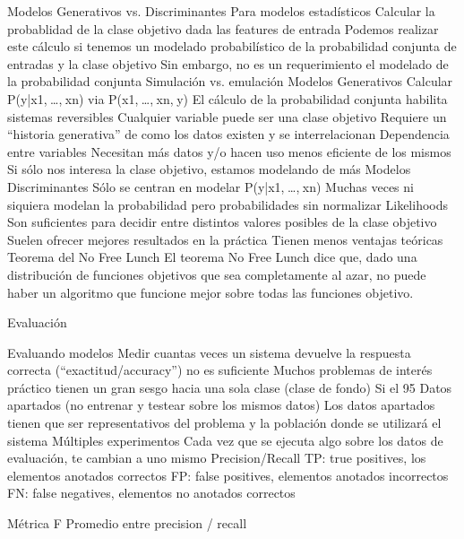 Modelos Generativos vs. Discriminantes
Para modelos estadísticos
Calcular la probablidad de la clase objetivo dada las features de entrada
Podemos realizar este cálculo si tenemos un modelado probabilístico de la probabilidad conjunta de entradas y la clase objetivo
Sin embargo, no es un requerimiento el modelado de la probabilidad conjunta
Simulación vs. emulación
Modelos Generativos
Calcular P(y|x1, …, xn) via P(x1, …, xn, y)
El cálculo de la probabilidad conjunta habilita sistemas reversibles
Cualquier variable puede ser una clase objetivo
Requiere un “historia generativa” de como los datos existen y se interrelacionan
Dependencia entre variables
Necesitan más datos y/o hacen uso menos eficiente de los mismos
Si sólo nos interesa la clase objetivo, estamos modelando de más
Modelos Discriminantes
Sólo se centran en modelar P(y|x1, …, xn)
Muchas veces ni siquiera modelan la probabilidad pero probabilidades sin normalizar
Likelihoods
Son suficientes para decidir entre distintos valores posibles de la clase objetivo
Suelen ofrecer mejores resultados en la práctica
Tienen menos ventajas teóricas
Teorema del No Free Lunch
El teorema No Free Lunch dice que, dado una distribución de funciones objetivos que sea completamente al azar, no puede haber un algoritmo que funcione mejor sobre todas las funciones objetivo.

Evaluación

Evaluando modelos
Medir cuantas veces un sistema devuelve la respuesta correcta (“exactitud/accuracy”) no es suficiente
Muchos problemas de interés práctico tienen un gran sesgo hacia una sola clase (clase de fondo)
Si el 95%
Datos apartados (no entrenar y testear sobre los mismos datos)
Los datos apartados tienen que ser representativos del problema y la población donde se utilizará el sistema
Múltiples experimentos
Cada vez que se ejecuta algo sobre los datos de evaluación, te cambian a uno mismo
Precision/Recall
TP: true positives, los elementos anotados correctos
FP: false positives, elementos anotados incorrectos
FN: false negatives, elementos no anotados correctos

Métrica F Promedio entre precision / recall

